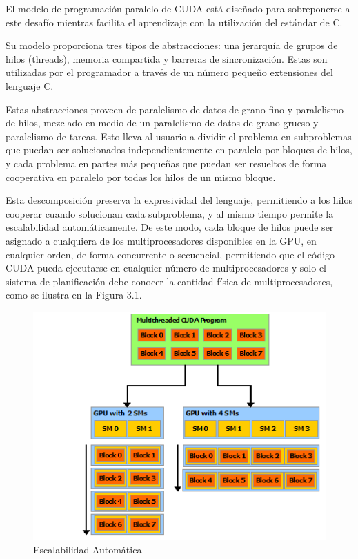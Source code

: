 \documentclass[a4paper,openright,12pt, oneside]{book}
\begin{document}
El modelo de programaci\'on paralelo de CUDA est\'a dise\~nado para sobreponerse a este
desaf\'io mientras facilita el aprendizaje con la utilizaci\'on del est\'andar de C.

Su modelo proporciona tres tipos de abstracciones: una jerarqu\'ia de grupos de hilos (threads),
memoria compartida y barreras de sincronizaci\'on. Estas son utilizadas por el programador
a trav\'es de un n\'umero peque\~no extensiones del lenguaje C.

Estas abstracciones proveen de paralelismo de datos de grano-fino y paralelismo de
hilos, mezclado en medio de un paralelismo de datos de grano-grueso y paralelismo de tareas.
Esto lleva al usuario a dividir el problema en subproblemas que puedan ser solucionados
independientemente en paralelo por bloques de hilos, y cada problema en partes m\'as
peque\~nas que puedan ser resueltos de forma cooperativa en paralelo por todas los
hilos de un mismo bloque.

Esta descomposici\'on preserva la expresividad del lenguaje, permitiendo a los hilos
cooperar cuando solucionan cada subproblema, y al mismo tiempo permite la escalabilidad
autom\'aticamente. De este modo, cada bloque de hilos puede ser asignado a cualquiera
de los multiprocesadores disponibles en la GPU, en cualquier orden, de forma concurrente
o secuencial, permitiendo que el c\'odigo CUDA pueda ejecutarse en cualquier n\'umero
de multiprocesadores y solo el sistema de planificaci\'on debe conocer la cantidad
f\'isica de multiprocesadores, como se ilustra en la Figura 3.1.

\begin{figure}[!htbp]
  \begin{center}
    \leavevmode

    \includegraphics[]{automatic-scalability.png}

    \caption{Escalabilidad Autom\'atica}
    \label{CUDA}
  \end{center}
\end{figure}
\end{document}
